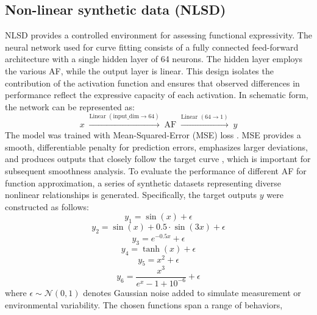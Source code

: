 \documentclass[manuscript, screen, review]{jair}
\begin{document}
\subsection{Non-linear synthetic data (NLSD)}
NLSD provides a controlled environment for assessing functional expressivity.
The neural network used for curve fitting consists of a fully connected feed-forward 
architecture with a single hidden layer of 64 neurons. 
The hidden layer employs the various AF, while the output layer is linear. 
This design isolates the contribution of the activation function and 
ensures that observed differences in performance reflect the expressive 
capacity of each activation.
In schematic form, the network can be represented as:
\begin{displaymath}
x \;\xrightarrow{\text{Linear } (\text{input\_dim} \to 64)}\;
\text{AF} \;\xrightarrow{\text{Linear } (64 \to 1)}\; y
\end{displaymath}
The model was trained with Mean-Squared-Error (MSE) loss \cite{BickelDoksum2015MathStats}.
MSE provides a smooth, differentiable penalty for prediction errors, 
emphasizes larger deviations, and produces outputs that closely follow 
the target curve \cite{Bishop2006PRML}, which is important for subsequent smoothness analysis.
To evaluate the performance of different AF for function approximation, 
a series of synthetic datasets representing diverse nonlinear relationships is generated. 
Specifically, the target outputs $y$ were constructed as follows:
\begin{equation}
y_1 = \sin(x) + \epsilon\tag{a}
\end{equation}
\begin{equation}
y_2 = \sin(x) + 0.5 \cdot \sin(3x) + \epsilon\tag{b}
\end{equation}
\begin{equation}
y_3 = e^{-0.5 x} + \epsilon\tag{c}
\end{equation}
\begin{equation}
y_4 = \tanh(x) + \epsilon\tag{d}
\end{equation}
\begin{equation}
y_5 = x^2 +  \epsilon\tag{e}
\end{equation}
\begin{equation}
y_6 = \frac{x^3}{e^{x} - 1 + 10^{-6}} + \epsilon\tag{f}
\end{equation}
where $\epsilon \sim \mathcal{N}(0,1)$ denotes Gaussian noise added to simulate measurement 
or environmental variability. The chosen functions span a range of behaviors, 
\end{document}
